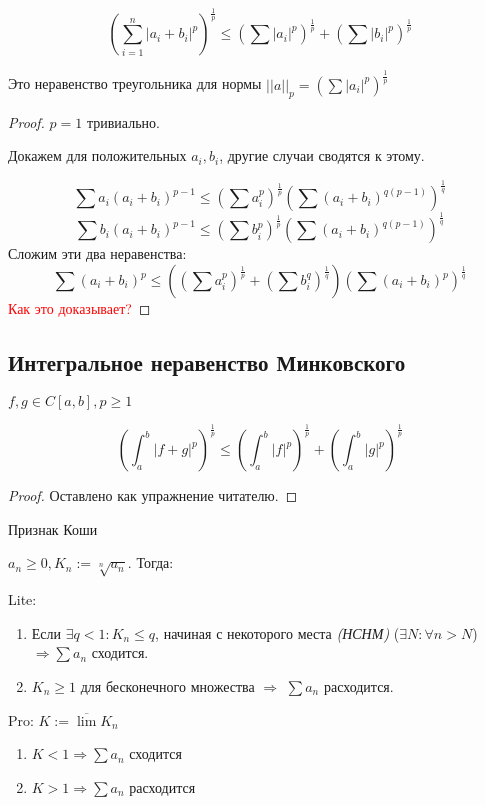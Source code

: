 $$\left(\sum_{i=1}^n |a_i+b_i|^p\right)^{\frac{1}{p}}\leq \left(\sum |a_i|^p\right)^{\frac{1}{p}}+\left(\sum |b_i|^p\right)^{\frac{1}{p}}$$

Это неравенство треугольника для нормы $||a||_p=\left(\sum |a_i|^p\right)^{\frac{1}{p}}$

\begin{proof}
    $p=1$ тривиально.

    Докажем для положительных $a_i, b_i$, другие случаи сводятся к этому.

    $$\sum a_i(a_i+b_i)^{p-1} \leq \left(\sum a_i^p\right)^\frac{1}{p}\left(\sum (a_i+b_i)^{q(p-1)}\right)^{\frac{1}{q}}$$
    $$\sum b_i(a_i+b_i)^{p-1} \leq \left(\sum b_i^p\right)^\frac{1}{p}\left(\sum (a_i+b_i)^{q(p-1)}\right)^{\frac{1}{q}}$$
    Сложим эти два неравенства:
    $$\sum (a_i+b_i)^p\leq \left(\left(\sum a_i^p\right)^{\frac{1}{p}} + \left(\sum b_i^q\right)^{\frac{1}{q}}\right)\left(\sum (a_i+b_i)^p\right)^{\frac{1}{q}}$$
    \textcolor{red}{Как это доказывает?}
\end{proof}

\subsection{Интегральное неравенство Минковского}

$f,g\in C[a,b], p\geq 1$

$$\left(\int_a^b |f+g|^p\right)^{\frac{1}{p}} \leq \left(\int_a^b |f|^p\right)^{\frac{1}{p}} + \left(\int_a^b |g|^p\right)^{\frac{1}{p}}$$

\begin{proof}
    Оставлено как упражнение читателю.
\end{proof}

\begin{theorem}
    Признак Коши

    $a_n\geq 0, K_n:=\sqrt[n]{a_n}$. Тогда:

    Lite:
    \begin{enumerate}
        \item Если $\exists q<1 : K_n\leq q$, начиная с некоторого места \textit{(НСНМ)} ($\exists N : \forall n>N$) $\Rightarrow \sum a_n$ сходится.
        \item $K_n\geq 1$ для бесконечного множества $\Rightarrow$ $\sum a_n$ расходится.
    \end{enumerate}

    Pro: $K:=\overline \lim K_n$
    \begin{enumerate}
        \item $K<1 \Rightarrow \sum a_n$ сходится
        \item $K>1 \Rightarrow \sum a_n$ расходится
    \end{enumerate}
\end{theorem}

